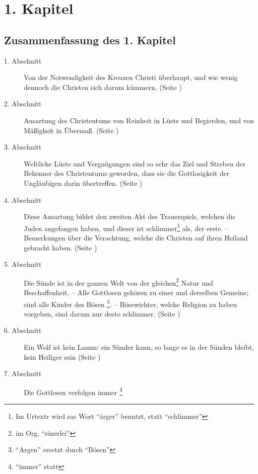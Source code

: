 


\chapter{1. Kapitel} \label{kap1} 

\section{Zusammenfassung des 1. Kapitel}
\small
\begin{description}
\item[1. Abschnitt] Von der Notwendigkeit des Kreuzen Christi überhaupt, und
wie wenig dennoch die Christen sich darum kümmern. (Seite \pageref{kap1_ab1})
\item[2. Abschnitt] Ausartung des Christentums von Reinheit in Lüste und
Begierden, und von Mäßigkeit in Übermaß. (Seite \pageref{kap1_ab2})
\item[3. Abschnitt] Weltliche Lüste und Vergnügungen sind so sehr das Ziel und
Streben der Bekenner des Christentums geworden, dass sie die Gottlosigkeit der
Ungläubigen darin übertreffen. (Seite \pageref{kap1_ab3})
\item[4. Abschnitt]  Diese Ausartung bildet den zweiten Akt des Trauerspiels,
welchen die Juden angefangen haben, und dieser ist schlimmer\footnote{Im Urtextr
wird sas Wort "`ärger"' benutzt, statt "`schlimmer"'} als, der erste. --
Bemerkungen über die Verachtung, welche die Christen auf ihren Heiland gebracht
haben. (Seite \pageref{kap1_ab4})
\item[5. Abschnitt] Die Sünde ist in der ganzen Welt von der
gleichen\footnote{im Org. "`einerlei"'} Natur und Beschaffenheit. -- Alle
Gottlosen gehören zu einer und derselben Gemeine;  
sind alle Kinder des Bösen \footnote{"`Argen"' ersetzt durch "`Bösen"'}. --
Bösewichter, welche Religion zu haben vorgeben, sind darum nur desto schlimmer.
(Seite \pageref{kap1_ab5})
\item[6. Abschnitt] Ein Wolf ist kein Lamm: ein Sünder kann, so lange es in der
Sünden bleibt, kein Heiliger sein (Seite \pageref{kap1_ab6})
\item[7. Abschnitt] Die Gottlosen verfolgen immer \footnote{"`immer"' statt
}
\end{description}
